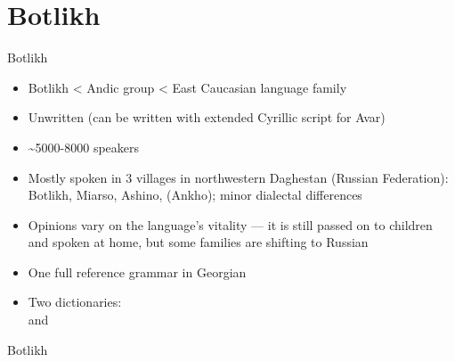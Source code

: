 
 



\begin{frame}
\titlepage

\end{frame}

\section{Botlikh}
\begin{frame}{Botlikh}
\begin{itemize}
    \item Botlikh < Andic group < East Caucasian language family
    \item Unwritten (can be written with extended Cyrillic script for Avar)
    \item \textasciitilde{}5000-8000 speakers
    \item Mostly spoken in 3 villages in northwestern Daghestan (Russian Federation): Botlikh, Miarso, Ashino, (Ankho); minor dialectal differences
    \item Opinions vary on the language's vitality --- it is still passed on to children and spoken at home, but some families are shifting to Russian
    \pause
    \item One full reference grammar in Georgian  \citep{gudava1962}
    \item Two dictionaries: \\
    \citep{saidovaabusov2012} and \citep{alekseev2019}
\end{itemize}
\end{frame}

\begin{frame}{Botlikh}
\begin{figure}[h]
\centering
{}
\end{figure}
\end{frame}

